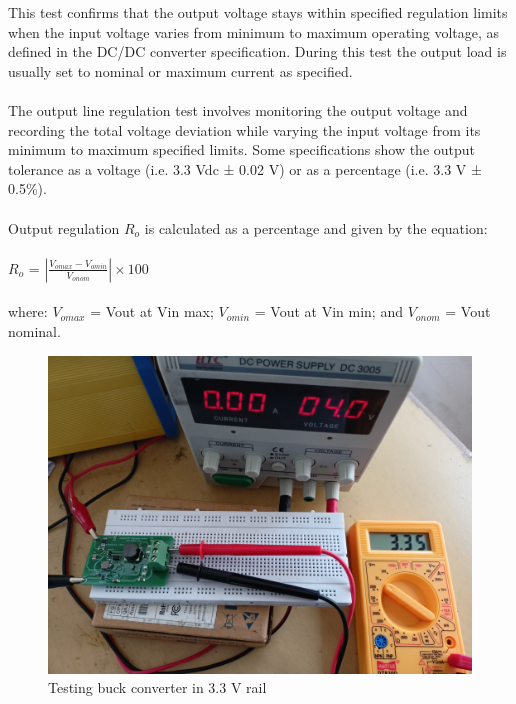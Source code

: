 This test confirms that the output voltage stays within specified regulation limits when the input voltage varies from minimum to maximum operating voltage, as defined in the DC/DC converter specification. During this test the output load is usually set to nominal or maximum current as specified.
\\ \\
The output line regulation test involves monitoring the output voltage and recording the total voltage deviation while varying the input voltage from its minimum to maximum specified limits. Some specifications show the output tolerance as a voltage (i.e. 3.3 Vdc ± 0.02 V) or as a percentage (i.e. 3.3 V ± 0.5\%).
\\ \\
Output regulation $R_{o}$ is calculated as a percentage and given by the equation:
\\ \\
\hspace*{5cm}$R_{o}$ = $\left | \frac{V_{omax}-V_{omin}}{V_{onom}} \right | \times 100$
\\ \\
where:
$V_{omax}$ = Vout at Vin max; 
$V_{omin}$ = Vout at Vin min; and
$V_{onom}$ = Vout nominal.

\begin{figure}[H]
	\centering
	\includegraphics[width=0.9\columnwidth]{IMGS/TestSetupPics/Buck_out.jpg}
	\caption{Testing buck converter in 3.3 V rail}
	\label{fig:arch}
\end{figure}

\pagebreak

